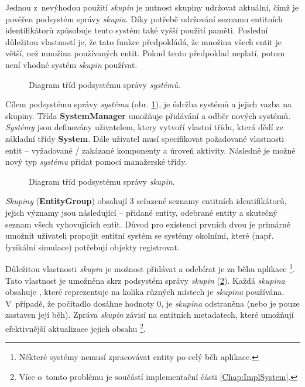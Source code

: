 Jednou z~nevýhodou použití \emph{skupin} je nutnost skupiny udržovat aktuální, čímž je pověřen podsystém správy \emph{skupin}. Díky potřebě udržování seznamu entitních identifikátorů způsobuje tento systém také vyšší použití paměti. Poslední důležitou vlastností je, že tato funkce předpokládá, že množina všech entit je větší, než množina používaných entit. Pokud tento předpoklad neplatí, potom není vhodné systém \emph{skupin} používat.

\begin{figure}[H]
	\centering
	\caption{Diagram tříd podsystému správy \emph{systémů}.}
	\label{Fig:DESSystemDiagram}
\end{figure}

Cílem podsystému správy \emph{systému} (obr. \ref{Fig:DESSystemDiagram}), je údržba systémů a jejich vazba na skupiny. Třída \textbf{SystemManager} umožňuje přidávání a odběr nových systémů. \emph{Systémy} jsou definovány uživatelem, ktery vytvoří vlastní třídu, která dědí ze základní třídy \textbf{System}. Dále uživatel musí specifikovat požadované vlastnosti entit -- vyžadované / zakázané komponenty a úroveň aktivity. Následně je možné nový typ \emph{systému} přidat pomocí manažerské třídy. 

\begin{figure}[H]
	\centering
	\caption{Diagram tříd podsystému správy \emph{skupin}.}
	\label{Fig:DESGroupDiag}
\end{figure}

\emph{Skupiny} (\textbf{EntityGroup}) obsahují 3 seřazené seznamy entitních identifikátorů, jejich významy jsou následující -- přidané entity, odebrané entity a skutečný seznam všech vyhovujících entit. Důvod pro existenci prvních dvou je primárně umožnit uživateli propojit entitní systém se systémy okolními, které (např. fyzikální simulace) potřebují objekty registrovat.

Důležitou vlastnosti \emph{skupin} je možnost přidávat a odebírat je za běhu aplikace \footnote{Některé systémy nemusí zpracovávat entity po celý běh aplikace.}. Tato vlastnost je umožněna skrz podsystém správy \emph{skupin} (\ref{Fig:DESGroupDiag}). Každá \emph{skupina} obsahuje , které reprezentuje na kolika různých místech je \emph{skupina} používána. V~případě, že počítadlo dosáhne hodnoty 0, je \emph{skupina} odstraněna (nebo je pouze zastaven její běh). Zpráva \emph{skupin} závisí na entitních metadatech, které umožňují efektivnější aktualizace jejich obsahu \footnote{Více o~tomto problému je součástí implementační části \ref{Chap:ImplSystem}.}.


